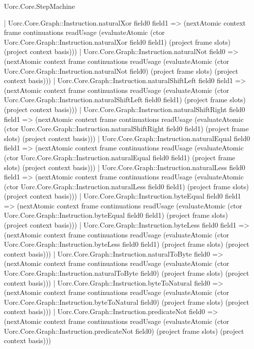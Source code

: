 \begin{lexlean}{Uorc.Core.StepMachine}
\begin{semanticmodule}
{      | Uorc.Core.Graph::Instruction.naturalXor field0 field1 => (nextAtomic context frame continuations readUsage (evaluateAtomic (ctor Uorc.Core.Graph::Instruction.naturalXor field0 field1) (project frame slots) (project context basis)))
      | Uorc.Core.Graph::Instruction.naturalNot field0 => (nextAtomic context frame continuations readUsage (evaluateAtomic (ctor Uorc.Core.Graph::Instruction.naturalNot field0) (project frame slots) (project context basis)))
      | Uorc.Core.Graph::Instruction.naturalShiftLeft field0 field1 => (nextAtomic context frame continuations readUsage (evaluateAtomic (ctor Uorc.Core.Graph::Instruction.naturalShiftLeft field0 field1) (project frame slots) (project context basis)))
      | Uorc.Core.Graph::Instruction.naturalShiftRight field0 field1 => (nextAtomic context frame continuations readUsage (evaluateAtomic (ctor Uorc.Core.Graph::Instruction.naturalShiftRight field0 field1) (project frame slots) (project context basis)))
      | Uorc.Core.Graph::Instruction.naturalEqual field0 field1 => (nextAtomic context frame continuations readUsage (evaluateAtomic (ctor Uorc.Core.Graph::Instruction.naturalEqual field0 field1) (project frame slots) (project context basis)))
      | Uorc.Core.Graph::Instruction.naturalLess field0 field1 => (nextAtomic context frame continuations readUsage (evaluateAtomic (ctor Uorc.Core.Graph::Instruction.naturalLess field0 field1) (project frame slots) (project context basis)))
      | Uorc.Core.Graph::Instruction.byteEqual field0 field1 => (nextAtomic context frame continuations readUsage (evaluateAtomic (ctor Uorc.Core.Graph::Instruction.byteEqual field0 field1) (project frame slots) (project context basis)))
      | Uorc.Core.Graph::Instruction.byteLess field0 field1 => (nextAtomic context frame continuations readUsage (evaluateAtomic (ctor Uorc.Core.Graph::Instruction.byteLess field0 field1) (project frame slots) (project context basis)))
      | Uorc.Core.Graph::Instruction.naturalToByte field0 => (nextAtomic context frame continuations readUsage (evaluateAtomic (ctor Uorc.Core.Graph::Instruction.naturalToByte field0) (project frame slots) (project context basis)))
      | Uorc.Core.Graph::Instruction.byteToNatural field0 => (nextAtomic context frame continuations readUsage (evaluateAtomic (ctor Uorc.Core.Graph::Instruction.byteToNatural field0) (project frame slots) (project context basis)))
      | Uorc.Core.Graph::Instruction.predicateNot field0 => (nextAtomic context frame continuations readUsage (evaluateAtomic (ctor Uorc.Core.Graph::Instruction.predicateNot field0) (project frame slots) (project context basis)))
}
\end{semanticmodule}
\end{lexlean}

